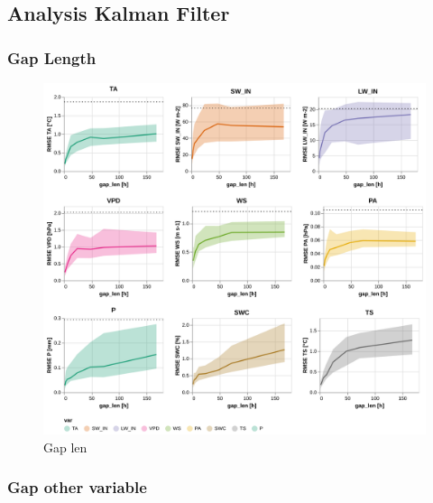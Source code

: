 \documentclass{article}
\newcommand{\imgwidth}{6in}
\let\Oldsubsection\subsection
\renewcommand{\subsection}{\FloatBarrier\Oldsubsection}
\begin{document}
\subsection{Analysis Kalman Filter}

\subsubsection{Gap Length}

\begin{figure}
\centerline{\includegraphics[width=\imgwidth]{gap_len}}
\caption{Gap len}
\label{fig:gap_len}
\end{figure}

\subsubsection{Gap other variable}
\end{document}
